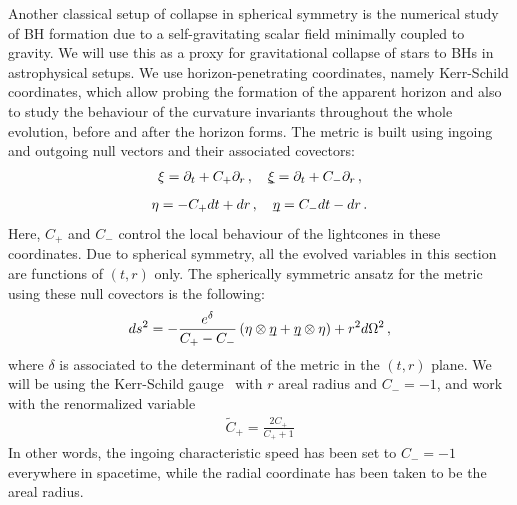 \documentclass[floats,floatfix,showpacs,amssymb,prd,twocolumn,superscriptaddress,nofootinbib,nolongbibliography,reprint]{revtex4-2}
\begin{document}
Another classical setup of collapse in spherical symmetry is the numerical study of BH formation due to a self-gravitating scalar field minimally coupled to gravity. We will use this as a proxy for gravitational collapse of stars to BHs in astrophysical setups. We use horizon-penetrating coordinates, namely Kerr-Schild coordinates, which allow probing the formation of the apparent horizon and also to study the behaviour of the curvature invariants throughout the whole evolution, before and after the horizon forms. The metric is built using ingoing and outgoing null vectors and their associated covectors:
%
\begin{align*}
  \xi= \partial_t + C_+\partial_r\,, \quad
  \text{\underbar{$\xi$}}=\partial_t + C_-\partial_r \, ,
\end{align*}
\begin{align*}
  \eta=-C_+ dt +dr\,, \quad
     \text{\underbar{$\eta$}}=C_-dt-dr \, .
\end{align*}
Here, $C_+$ and $C_-$ control the local behaviour of the lightcones in these coordinates. Due to spherical symmetry, all the evolved variables in this section are functions of $(t,r)$ only. The spherically symmetric ansatz for the metric using these null covectors is the following:
%
  \begin{align}
  ds^2=-\frac{e^{\delta}}{C_+-C_-}\left(\eta \otimes\text{\underbar{$\eta$}} +\text{\underbar{$\eta$}}\otimes \eta\right) +r^2 d\Omega^2 \,,
  \end{align}
  where $\delta$ is associated to the determinant of the metric in the $(t,r)$ plane. We will be using the Kerr-Schild gauge~\cite{Bhattacharyya_2021} with $r$ areal radius and $C_-=-1$, and work with the renormalized variable 
\begin{align}
    \tilde{C}_+=\frac{2 C_+}{C_++1} 
\end{align}
 In other words, the ingoing characteristic speed has been set to $C_-=-1$ everywhere in spacetime, while the radial coordinate has been taken to be the areal radius.
\end{document}
